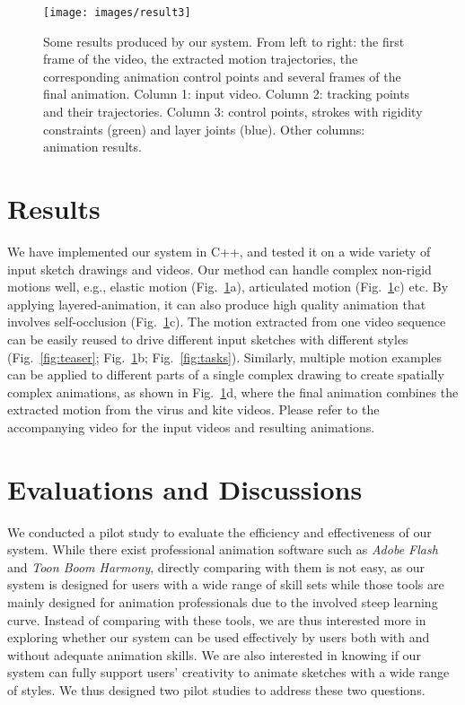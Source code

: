 \begin{figure}
	\centering
	\texttt{[image: images/result3]}
	\caption{Some results produced by our system. From left to right: the first frame of the video, the extracted motion trajectories, the corresponding animation control points and several frames of the final animation. Column 1: input video. Column 2: tracking points and their trajectories. Column 3: control points, strokes with rigidity constraints (green) and layer joints (blue). Other columns: animation results. }
	\label{fig:results}
\end{figure}


\section{Results}\label{sec:results}

We have implemented our system in C++, and tested it on  a wide variety of input sketch drawings and videos. Our method can handle complex non-rigid motions well, e.g., elastic motion (Fig.~\ref{fig:results}a), articulated motion (Fig.~\ref{fig:results}c) etc.
By applying layered-animation, it can also produce high quality animation that involves self-occlusion (Fig.~\ref{fig:results}c).
 The motion extracted from one video sequence can be easily reused to drive different input sketches with different styles (Fig.~\ref{fig:teaser}; Fig.~\ref{fig:results}b; Fig.~\ref{fig:tasks}). Similarly, multiple motion examples can be applied to different parts of a single complex drawing to create spatially complex animations, as shown in Fig.~\ref{fig:results}d, where the final animation combines the extracted motion from the virus and kite videos. Please refer to the accompanying video for the input videos and resulting animations. 
 

\section{Evaluations and Discussions}\label{sec:evaluation}

We conducted a pilot study to evaluate the efficiency and effectiveness of our system. While there exist professional animation software such as \emph{Adobe Flash} and \emph{Toon Boom Harmony}, directly comparing with them is not easy, as our system is designed for users with a wide range of skill sets while those tools are mainly designed for animation professionals due to the involved steep learning curve. Instead of comparing with these tools, we are thus interested more in exploring whether our system can be used effectively by users both with and without adequate animation skills. We are also interested in knowing if our system can fully support users' creativity to animate sketches with a wide range of styles. 
We thus designed two pilot studies to address these two questions. 

